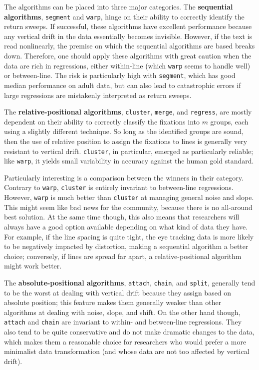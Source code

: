 \documentclass[doc,biblatex]{apa7}
\begin{document}
The algorithms can be placed into three major categories. The \textbf{sequential algorithms}, \texttt{segment} and \texttt{warp}, hinge on their ability to correctly identify the return sweeps. If successful, these algorithms have excellent performance because any vertical drift in the data essentially becomes invisible. However, if the text is read nonlinearly, the premise on which the sequential algorithms are based breaks down. Therefore, one should apply these algorithms with great caution when the data are rich in regressions, either within-line (which \texttt{warp} seems to handle well) or between-line. The risk is particularly high with \texttt{segment}, which has good median performance on adult data, but can also lead to catastrophic errors if large regressions are mistakenly interpreted as return sweeps.

The \textbf{relative-positional algorithms}, \texttt{cluster}, \texttt{merge}, and \texttt{regress}, are mostly dependent on their ability to correctly classify the fixations into $m$ groups, each using a slightly different technique. So long as the identified groups are sound, then the use of relative position to assign the fixations to lines is generally very resistant to vertical drift. \texttt{cluster}, in particular, emerged as particularly reliable; like \texttt{warp}, it yields small variability in accuracy against the human gold standard.

Particularly interesting is a comparison between the winners in their category. Contrary to \texttt{warp}, \texttt{cluster} is entirely invariant to between-line regressions. However, \texttt{warp} is much better than \texttt{cluster} at managing general noise and slope. This might seem like bad news for the community, because there is no all-around best solution. At the same time though, this also means that researchers will always have a good option available depending on what kind of data they have. For example, if the line spacing is quite tight, the eye tracking data is more likely to be negatively impacted by distortion, making a sequential algorithm a better choice; conversely, if lines are spread far apart, a relative-positional algorithm might work better.

The \textbf{absolute-positional algorithms}, \texttt{attach}, \texttt{chain}, and \texttt{split}, generally tend to be the worst at dealing with vertical drift because they assign based on absolute position; this feature makes them generally weaker than other algorithms at dealing with noise, slope, and shift. On the other hand though, \texttt{attach} and \texttt{chain} are invariant to within- and between-line regressions. They also tend to be quite conservative and do not make dramatic changes to the data, which makes them a reasonable choice for researchers who would prefer a more minimalist data transformation (and whose data are not too affected by vertical drift).
\end{document}
